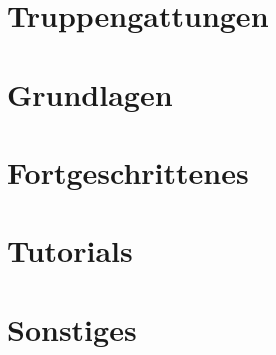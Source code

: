 \documentclass[pdftex,fontsize=12pt,a4paper,numbers=noenddot]{scrreprt}
\begin{document}


\newpage
{} %
\tableofcontents %

\newpage
{} %


\chapter{Truppengattungen}

\newpage

\chapter{Grundlagen}








\newpage

\chapter{Fortgeschrittenes}










\newpage

\chapter{Tutorials}

\newpage

\chapter{Sonstiges}





\cleardoublepage
\appendix
\end{document}
